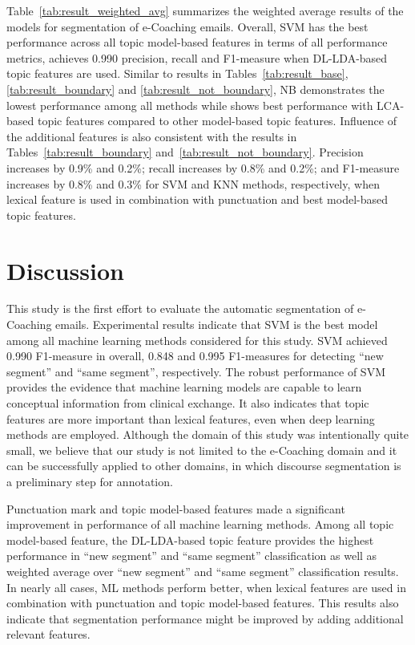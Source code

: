 \documentclass{amia}
\begin{document}
Table~\ref{tab:result_weighted_avg} summarizes the weighted average results of the models for segmentation of e-Coaching emails. Overall, SVM has the best performance across all topic model-based features in terms of all performance metrics, achieves 0.990 precision, recall and F1-measure when DL-LDA-based topic features are used. Similar to results in Tables~\ref{tab:result_base}, \ref{tab:result_boundary} and \ref{tab:result_not_boundary}, NB demonstrates the lowest performance among all methods while shows best performance with LCA-based topic features compared to other model-based topic features. Influence of the additional features is also consistent with the results in Tables~\ref{tab:result_boundary} and~\ref{tab:result_not_boundary}. Precision increases by 0.9\% and 0.2\%; recall increases by 0.8\% and 0.2\%; and F1-measure increases by 0.8\% and 0.3\% for SVM and KNN methods, respectively, when lexical feature is used in combination with punctuation and best model-based topic features.\\

\section*{Discussion}
This study is the first effort to evaluate the automatic segmentation of e-Coaching emails. Experimental results indicate that SVM is the best model among all machine learning methods considered for this study. SVM achieved 0.990 F1-measure in overall, 0.848 and 0.995 F1-measures for detecting ``new segment'' and ``same segment'', respectively. The robust performance of SVM provides the evidence that machine learning models are capable to learn conceptual information from clinical exchange. It also indicates that topic features are more important than lexical features, even when deep learning methods are employed. Although the domain of this study was intentionally quite small, we believe that our study is not limited to the e-Coaching domain and it can be successfully applied to other domains, in which discourse segmentation is a preliminary step for annotation.

Punctuation mark and topic model-based features made a significant improvement in performance of all machine learning methods. Among all topic model-based feature, the DL-LDA-based topic feature provides the highest performance in ``new segment'' and ``same segment'' classification as well as weighted average over ``new segment'' and ``same segment'' classification results. In nearly all cases, ML methods perform better, when lexical features are used in combination with punctuation and topic model-based features. This results also indicate that segmentation performance might be improved by adding additional relevant features.         
\end{document}
